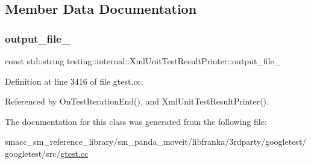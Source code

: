 \subsection{Member Data Documentation}
\mbox{\label{classtesting_1_1internal_1_1XmlUnitTestResultPrinter_aa81cc4540d16279f5eb5f7ec9f366ea7}} 
\subsubsection{\texorpdfstring{output\+\_\+file\+\_\+}{output\_file\_}}
{\footnotesize\ttfamily const std\+::string testing\+::internal\+::\+Xml\+Unit\+Test\+Result\+Printer\+::output\+\_\+file\+\_\+\hspace{0.3cm}{\ttfamily [private]}}



Definition at line 3416 of file gtest.\+cc.



Referenced by On\+Test\+Iteration\+End(), and Xml\+Unit\+Test\+Result\+Printer().



The documentation for this class was generated from the following file\+:\begin{DoxyCompactItemize}
\item 
smacc\+\_\+sm\+\_\+reference\+\_\+library/sm\+\_\+panda\+\_\+moveit/libfranka/3rdparty/googletest/googletest/src/\hyperlink{gtest_8cc}{gtest.\+cc}\end{DoxyCompactItemize}
